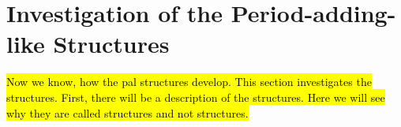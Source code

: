 \section{Investigation of the Period-adding-like Structures}
\label{sec:add.add}

\hl{
	Now we know, how the \gls{pal} structures develop.
	This section investigates the  structures.
	First, there will be a description of the structures.
	Here we will see why they are called  structures and not  structures.
}


\clearpage



